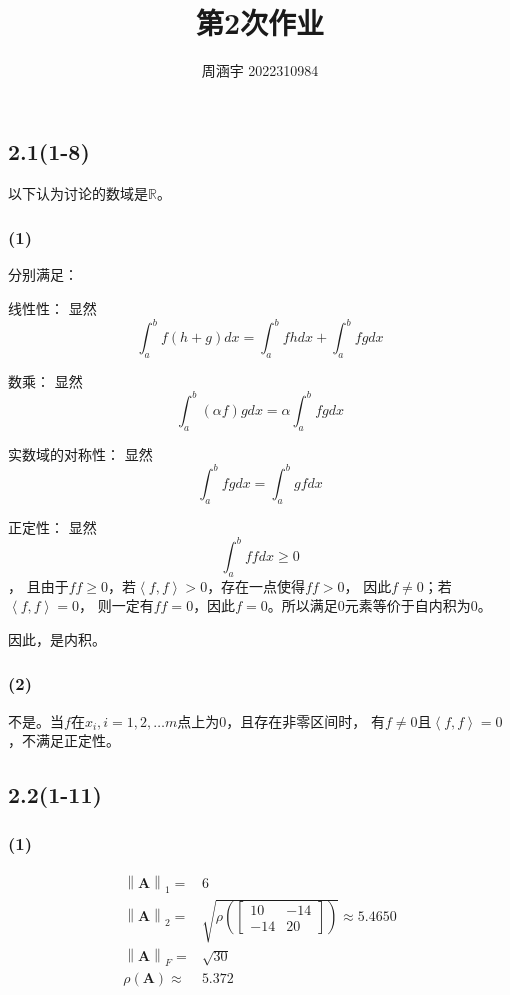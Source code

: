 \documentclass[UTF8,zihao=5]{ctexart}
\title{{\bfseries 第2次作业}}
\author{周涵宇 2022310984}
\date{}
\newcommand{\bm}[1]{{\mathbf{#1}}}
\newcommand*{\av}[1]{\left\langle{#1}\right\rangle}
\begin{document}
\maketitle

\subsection*{2.1(1-8)}

以下认为讨论的数域是$\mathbb{R}$。

\subsubsection*{(1)}
分别满足：

线性性：
显然
$$
\int_a^b{f(h+g) dx}=\int_a^b{fh dx}+\int_a^b{fg dx}
$$

数乘：
显然
$$
\int_a^b{(\alpha f)g dx}=\alpha\int_a^b{fg dx}
$$

实数域的对称性：
显然
$$
\int_a^b{fg dx}=\int_a^b{gf dx}
$$

正定性：
显然
$$
\int_a^b{ff dx}\geq 0
$$，
且由于$ff\geq 0$，若$\av{f,f}>0$，存在一点使得$ff > 0$，
因此$f\neq 0$；若$\av{f,f}=0$，
则一定有$ff=0$，因此$f=0$。所以满足0元素等价于自内积为0。

因此，是内积。

\subsubsection*{(2)}
不是。当$f$在$x_i, i=1,2,\dots m$点上为0，且存在非零区间时，
有$f\neq0$且$\av{f,f}=0$，不满足正定性。

\subsection*{2.2(1-11)}

\subsubsection*{(1)}
\begin{equation*}
    \begin{aligned}
        \left\|\bm{A}\right\|_1 =& 6\\
        \left\|\bm{A}\right\|_2 =& \sqrt{\rho\left(
            \begin{bmatrix}
                10 & -14\\-14 & 20
            \end{bmatrix}
        \right)}\approx5.4650\\
        \left\|\bm{A}\right\|_F =& \sqrt{30}\\
        \rho(\bm{A})\approx&5.372
    \end{aligned}
\end{equation*}
\end{document}
